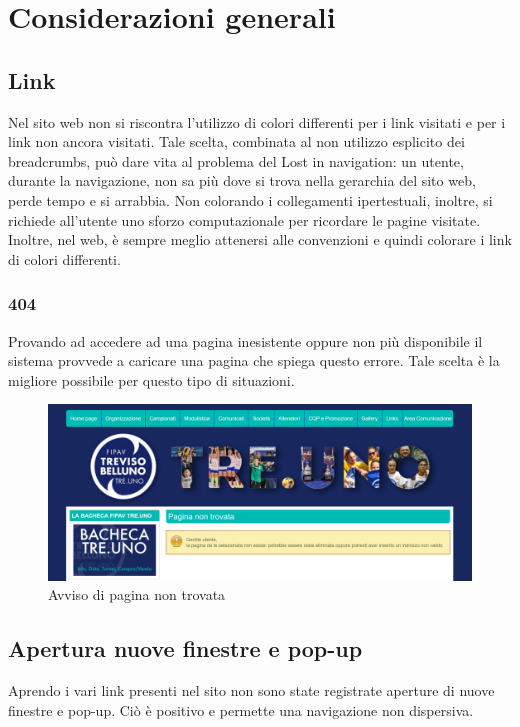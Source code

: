 \section{Considerazioni generali}
	\subsection{Link}
	Nel sito web non si riscontra l'utilizzo di colori differenti per i link visitati 
	e per i link non ancora visitati. Tale scelta, combinata al non utilizzo 
	esplicito dei breadcrumbs, può dare vita al problema del Lost in navigation: un 
	utente, durante la navigazione, non sa più dove si trova nella gerarchia del sito 
	web, perde tempo e si arrabbia. Non colorando i collegamenti ipertestuali, 
	inoltre, si richiede all'utente uno sforzo computazionale per ricordare le pagine 
	visitate.
	Inoltre, nel web, è sempre meglio attenersi alle convenzioni e quindi colorare i
	link di colori differenti. 
	
	\subsubsection{404}
	Provando ad accedere ad una pagina inesistente oppure non più disponibile il
	sistema provvede a caricare una pagina che spiega questo errore. Tale scelta è la
	migliore possibile per questo tipo di situazioni. 
	
	\begin{figure}[H]
	\centering
	\includegraphics[scale=0.5]{Images/404.png}
	\caption{Avviso di pagina non trovata}
	\end{figure}
	
	\subsection{Apertura nuove finestre e pop-up}
	Aprendo i vari link presenti nel sito non sono state registrate aperture di nuove
	finestre e pop-up. Ciò è positivo e permette una navigazione non dispersiva.
	
